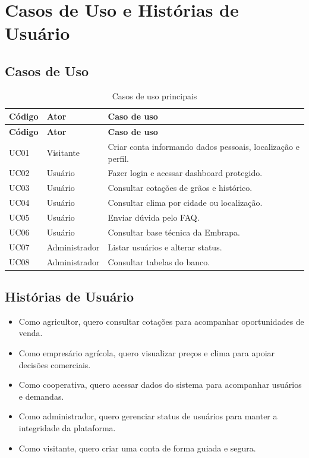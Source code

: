 \documentclass[
  12pt,
  oneside,
  a4paper,
  brazil
]{abntex2}
\begin{document}
\chapter{Casos de Uso e Histórias de Usuário}

\section{Casos de Uso}

\begin{longtable}{@{}p{}p{}p{}@{}}
\caption{Casos de uso principais}\\
\toprule
\textbf{Código} & \textbf{Ator} & \textbf{Caso de uso} \\
\midrule
\endfirsthead
\toprule
\textbf{Código} & \textbf{Ator} & \textbf{Caso de uso} \\
\midrule
\endhead
UC01 & Visitante & Criar conta informando dados pessoais, localização e perfil. \\
UC02 & Usuário & Fazer login e acessar dashboard protegido. \\
UC03 & Usuário & Consultar cotações de grãos e histórico. \\
UC04 & Usuário & Consultar clima por cidade ou localização. \\
UC05 & Usuário & Enviar dúvida pelo FAQ. \\
UC06 & Usuário & Consultar base técnica da Embrapa. \\
UC07 & Administrador & Listar usuários e alterar status. \\
UC08 & Administrador & Consultar tabelas do banco. \\
\bottomrule
\end{longtable}

\section{Histórias de Usuário}

\begin{itemize}
  \item Como agricultor, quero consultar cotações para acompanhar oportunidades de venda.
  \item Como empresário agrícola, quero visualizar preços e clima para apoiar decisões comerciais.
  \item Como cooperativa, quero acessar dados do sistema para acompanhar usuários e demandas.
  \item Como administrador, quero gerenciar status de usuários para manter a integridade da plataforma.
  \item Como visitante, quero criar uma conta de forma guiada e segura.
\end{itemize}
\end{document}
